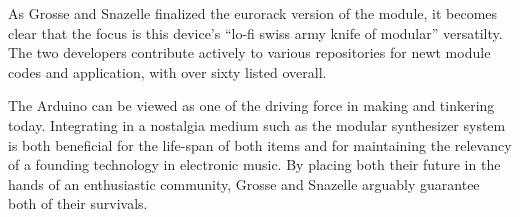 As Grosse and Snazelle finalized the eurorack version of the module, it becomes clear that the focus is this device's ``lo-fi swiss army knife of modular'' versatilty. The two developers contribute actively to various repositories for newt module codes and application, with over sixty listed overall. 

The Arduino can be viewed as one of the driving force in making and tinkering today. Integrating in a nostalgia medium such as the modular synthesizer system is both beneficial for the life-span of both items and for maintaining the relevancy of a founding technology in electronic music. By placing both their future in the hands of an enthusiastic community, Grosse and Snazelle arguably guarantee both of their survivals.  











